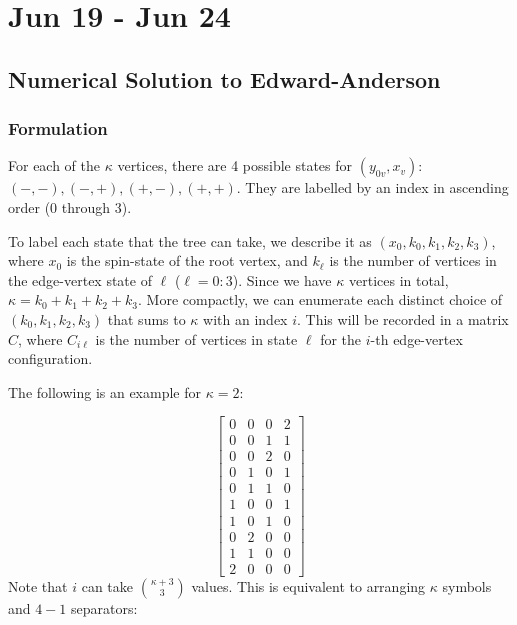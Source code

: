 \documentclass[12pt]{article}
\begin{document}
\newpage

\section{Jun 19 - Jun 24}

\subsection{Numerical Solution to Edward-Anderson}

\subsubsection{Formulation}

For each of the $\kappa$ vertices, there are 4 possible states for $(y_{0v}, x_v)$: $(-, -), (-, +), (+, -), (+, +)$.
They are labelled by an index in ascending order (0 through 3).

To label each state that the tree can take, we describe it as $(x_0, k_0, k_1, k_2, k_3)$, where $x_0$ is the spin-state of the root vertex,
and $k_\ell$ is the number of vertices in the edge-vertex state of $\ell$ ($\ell=0:3$). Since we have $\kappa$ vertices in total, $\kappa=k_0+k_1+k_2+k_3$.
More compactly, we can enumerate each distinct choice of $(k_0, k_1, k_2, k_3)$ that sums to $\kappa$ with an index $i$. This will be recorded in
a matrix $C$, where $C_{i\ell}$ is the number of vertices in state $\ell$ for the $i$-th edge-vertex configuration.

The following is an example for $\kappa=2$:

\begin{equation*}
    \begin{bmatrix}
        0 & 0 & 0 & 2 \\
        0 & 0 & 1 & 1 \\
        0 & 0 & 2 & 0 \\
        0 & 1 & 0 & 1 \\
        0 & 1 & 1 & 0 \\
        1 & 0 & 0 & 1 \\
        1 & 0 & 1 & 0 \\
        0 & 2 & 0 & 0 \\
        1 & 1 & 0 & 0 \\
        2 & 0 & 0 & 0
    \end{bmatrix}
\end{equation*}
Note that $i$ can take ${\kappa+3 \choose 3}$ values. This is equivalent to arranging $\kappa$ symbols and $4-1$ separators:
\end{document}
